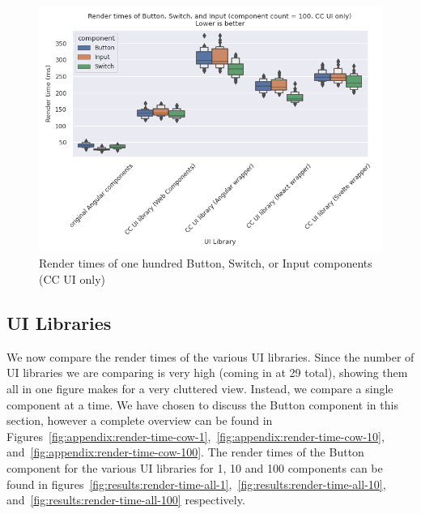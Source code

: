 \begin{figure}[h]
  \includegraphics[width=\columnwidth]{plots/render-time-cow-100.png}
  \caption{Render times of one hundred Button, Switch, or Input components (CC UI only)}
  \label{fig:results:render-time-cow-100}
  \centering
\end{figure}

\subsection{UI Libraries}
We now compare the render times of the various UI libraries. Since the number of UI libraries we are comparing is very high (coming in at 29 total), showing them all in one figure makes for a very cluttered view. Instead, we compare a single component at a time. We have chosen to discuss the Button component in this section, however a complete overview can be found in Figures~\ref{fig:appendix:render-time-cow-1},~\ref{fig:appendix:render-time-cow-10}, and~\ref{fig:appendix:render-time-cow-100}. The render times of the Button component for the various UI libraries for 1, 10 and 100 components can be found in figures~\ref{fig:results:render-time-all-1},~\ref{fig:results:render-time-all-10}, and~\ref{fig:results:render-time-all-100} respectively.

